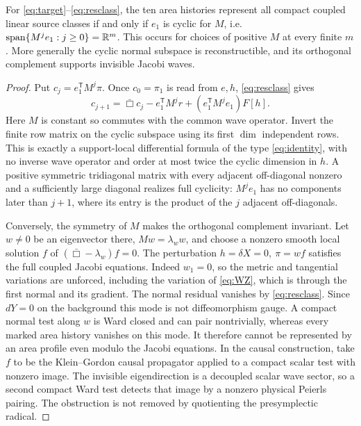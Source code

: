 \begin{theorem}\label{thm:cyclic}
For \eqref{eq:target}--\eqref{eq:resclass}, the ten area histories represent all compact coupled linear source classes if and only if \(e_1\) is cyclic for \(M\), i.e. \(\operatorname{span}\{M^je_1:j\ge0\}=\mathbb R^m\). This occurs for choices of positive \(M\) at every finite \(m\). More generally the cyclic normal subspace is reconstructible, and its orthogonal complement supports invisible Jacobi waves.
\end{theorem}
\begin{proof}
Put \(c_j=e_1^{\mathsf T}M^j\pi\). Once \(c_0=\pi_1\) is read from \(e,h\), \eqref{eq:resclass} gives
\[
 c_{j+1}=\bar\Box c_j-e_1^{\mathsf T}M^j r
                             +(e_1^{\mathsf T}M^je_1)F[h].
\]
Here \(M\) is constant so commutes with the common wave operator. Invert the finite row matrix on the cyclic subspace using its first \(\dim\) independent rows. This is exactly a support-local differential formula of the type \eqref{eq:identity}, with no inverse wave operator and order at most twice the cyclic dimension in \(h\). A positive symmetric tridiagonal matrix with every adjacent off-diagonal nonzero and a sufficiently large diagonal realizes full cyclicity: \(M^je_1\) has no components later than \(j+1\), where its entry is the product of the \(j\) adjacent off-diagonals.

Conversely, the symmetry of \(M\) makes the orthogonal complement invariant. Let \(w\ne0\) be an eigenvector there, \(Mw=\lambda_w w\), and choose a nonzero smooth local solution \(f\) of \((\bar\Box-\lambda_w)f=0\). The perturbation \(h=\delta X=0,\ \pi=wf\) satisfies the full coupled Jacobi equations. Indeed \(w_1=0\), so the metric and tangential variations are unforced, including the variation of \eqref{eq:WZ}, which is through the first normal and its gradient. The normal residual vanishes by \eqref{eq:resclass}. Since \(dY=0\) on the background this mode is not diffeomorphism gauge. A compact normal test along \(w\) is Ward closed and can pair nontrivially, whereas every marked area history vanishes on this mode. It therefore cannot be represented by an area profile even modulo the Jacobi equations. In the causal construction, take \(f\) to be the Klein--Gordon causal propagator applied to a compact scalar test with nonzero image. The invisible eigendirection is a decoupled scalar wave sector, so a second compact Ward test detects that image by a nonzero physical Peierls pairing. The obstruction is not removed by quotienting the presymplectic radical.
\end{proof}

